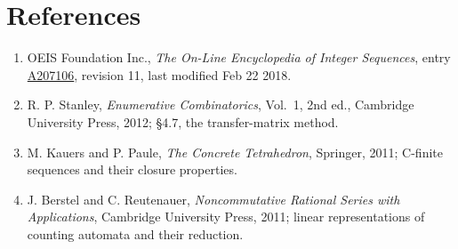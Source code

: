 \documentclass[11pt]{article}
\theoremstyle{definition}
\begin{document}
\section{References}

\begin{enumerate}

\item OEIS Foundation Inc., \emph{The On-Line Encyclopedia of Integer Sequences}, entry \href{https://oeis.org/A207106}{A207106}, revision 11, last modified Feb 22 2018.

\item R. P. Stanley, \emph{Enumerative Combinatorics}, Vol.~1, 2nd ed., Cambridge University Press, 2012; \S4.7, the transfer-matrix method.

\item M. Kauers and P. Paule, \emph{The Concrete Tetrahedron}, Springer, 2011; C-finite sequences and their closure properties.

\item J. Berstel and C. Reutenauer, \emph{Noncommutative Rational Series with Applications}, Cambridge University Press, 2011; linear representations of counting automata and their reduction.

\end{enumerate}
\end{document}
